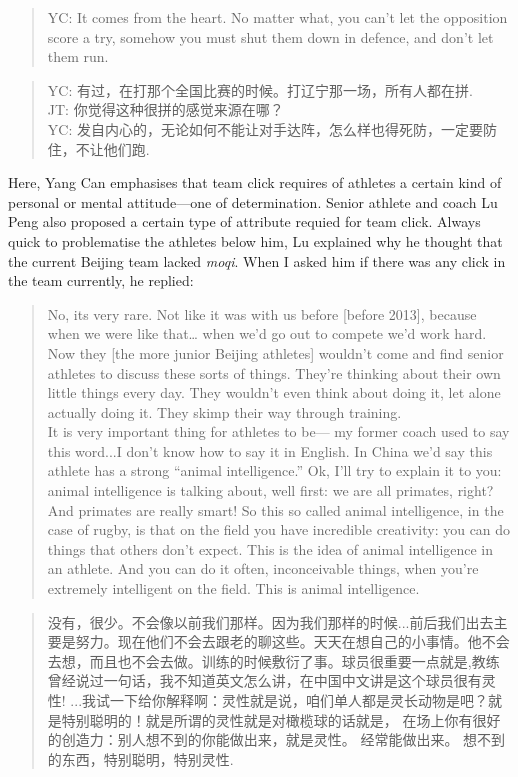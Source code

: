\begin{CJK}{UTF8}{gbsn}
\begin{quote}
      YC: It comes from the heart. No matter what, you can’t let the opposition score a try, somehow you must shut them down in defence, and don’t let them run.
    \end{quote}

    \begin{quote}
      YC: 有过，在打那个全国比赛的时候。打辽宁那一场，所有人都在拼.\\
      JT: 你觉得这种很拼的感觉来源在哪？\\
      YC: 发自内心的，无论如何不能让对手达阵，怎么样也得死防，一定要防住，不让他们跑.
    \end{quote}

Here, Yang Can emphasises that team click requires of athletes a certain kind of personal or mental attitude---one of determination.   Senior athlete and coach Lu Peng also proposed a certain type of attribute requied for team click.  Always quick to problematise the athletes below him, Lu explained why he thought that the current Beijing team lacked \textit{moqi}.  When I asked him if there was any click in the team currently, he replied:

      \begin{quote}
        No, its very rare.  Not like it was with us before [before 2013], because when we were like that… when we'd go out to compete we'd work hard.  Now they [the more junior Beijing athletes] wouldn't come and find senior athletes to discuss these sorts of things.  They're thinking about their own little things every day.  They wouldn’t even think about doing it, let alone actually doing it.  They skimp their way through training.  \\

        It is very important thing for athletes to be--- my former coach used to say this word...I don't know how to say it in English.  In China we'd say this athlete has a strong ``animal intelligence.'' Ok, I'll try to explain it to you: animal intelligence is talking about, well first: we are all primates, right?  And primates are really smart!  So this so called animal intelligence, in the case of rugby, is that on the field you have incredible creativity: you can do things that others don't expect.  This is the idea of animal intelligence in an athlete.  And you can do it often, inconceivable things, when you're extremely intelligent on the field. This is animal intelligence.
      \end{quote}

      \begin{quote}
        没有，很少。不会像以前我们那样。因为我们那样的时候...前后我们出去主要是努力。现在他们不会去跟老的聊这些。天天在想自己的小事情。他不会去想，而且也不会去做。训练的时候敷衍了事。球员很重要一点就是,教练曾经说过一句话，我不知道英文怎么讲，在中国中文讲是这个球员很有灵性! ...我试一下给你解释啊：灵性就是说，咱们单人都是灵长动物是吧？就是特别聪明的！就是所谓的灵性就是对橄榄球的话就是， 在场上你有很好的创造力：别人想不到的你能做出来，就是灵性。 经常能做出来。 想不到的东西，特别聪明，特别灵性.
      \end{quote}


\end{CJK}
